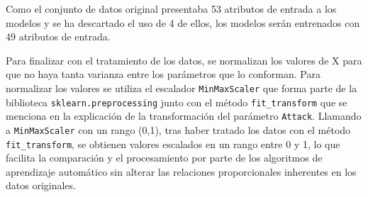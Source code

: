 Como el conjunto de datos original presentaba 53 atributos de entrada a los modelos y se ha descartado el uso de 4 de ellos, los modelos serán entrenados con 49 atributos de entrada. 

Para finalizar con el tratamiento de los datos, se normalizan los valores de X para que no haya tanta varianza entre los parámetros que lo conforman. Para normalizar los valores se utiliza el escalador \texttt{MinMaxScaler} que forma parte de la biblioteca \texttt{sklearn.preprocessing} junto con el método \texttt{fit\_transform} que se menciona en la explicación de la transformación del parámetro \texttt{Attack}. Llamando a \texttt{MinMaxScaler} con un rango (0,1), tras haber tratado los datos con el método \texttt{fit\_transform}, se obtienen valores escalados en un rango entre 0 y 1, lo que facilita la comparación y el procesamiento por parte de los algoritmos de aprendizaje automático sin alterar las relaciones proporcionales inherentes en los datos originales.
